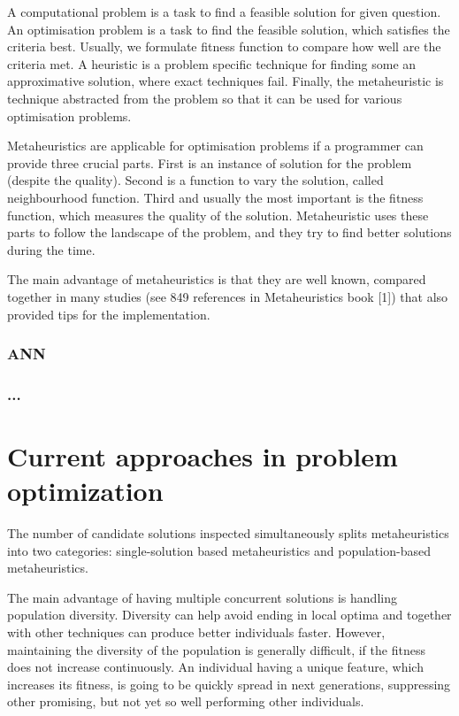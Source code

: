 \documentclass[
  print, %
  Table,   %
  nolof,     %
  nolot,     %
  11pt, %
  oneside  %
]{fithesis3}
\begin{document}
A computational problem is a task to find a feasible solution for given question. An optimisation problem is a task to find the feasible solution, which satisfies the criteria best. Usually, we formulate fitness function to compare how well are the criteria met. A heuristic is a problem specific technique for finding some an approximative solution, where exact techniques fail. Finally, the metaheuristic is technique abstracted from the problem so that it can be used for various optimisation problems.

Metaheuristics are applicable for optimisation problems if a programmer can provide three crucial parts. First is an instance of solution for the problem (despite the quality). Second is a function to vary the solution, called neighbourhood function. Third and usually the most important is the fitness function, which measures the quality of the solution. Metaheuristic uses these parts to follow the landscape of the problem, and they try to find better solutions during the time.

The main advantage of metaheuristics is that they are well known, compared together in many studies (see 849 references in Metaheuristics book [1]) that also provided tips for the implementation.

\subsection{ANN}
\label{subsec:prob-opt-ann}

\subsection{...}

\chapter{Current approaches in problem optimization}
\label{chap:optimisation}

The number of candidate solutions inspected simultaneously splits metaheuristics into two categories: single-solution based metaheuristics and population-based metaheuristics.

The main advantage of having multiple concurrent solutions is handling population diversity. Diversity can help avoid ending in local optima and together with other techniques can produce better individuals faster. However, maintaining the diversity of the population is generally difficult, if the fitness does not increase continuously. An individual having a unique feature, which increases its fitness, is going to be quickly spread in next generations, suppressing other promising, but not yet so well performing other individuals.
\end{document}
